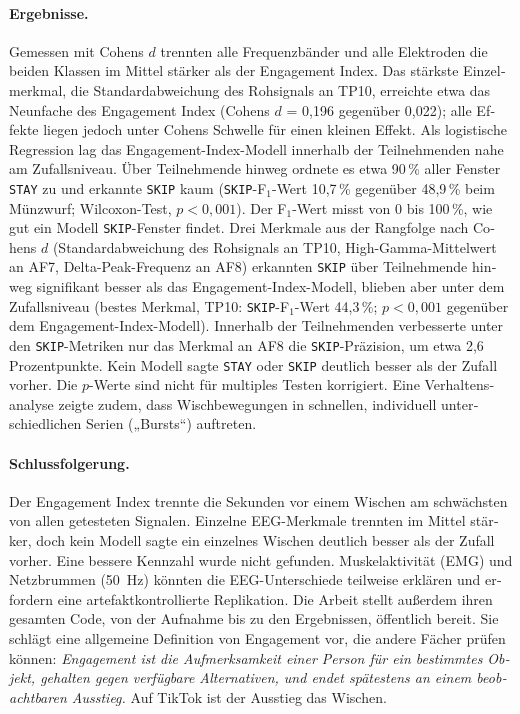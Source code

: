 \documentclass[12pt,a4paper]{report}
\begin{document}
\begin{otherlanguage}{ngerman}
\paragraph{Ergebnisse.} Gemessen mit Cohens \(d\) trennten alle Frequenzbänder und alle Elektroden die beiden Klassen im Mittel stärker als der Engagement Index. Das stärkste Einzelmerkmal, die Standardabweichung des Rohsignals an TP10, erreichte etwa das Neunfache des Engagement Index (Cohens \(d\) = 0{,}196 gegenüber 0{,}022); alle Effekte liegen jedoch unter Cohens Schwelle für einen kleinen Effekt. Als logistische Regression lag das Engagement-Index-Modell innerhalb der Teilnehmenden nahe am Zufallsniveau. Über Teilnehmende hinweg ordnete es etwa 90\,\% aller Fenster \texttt{STAY} zu und erkannte \texttt{SKIP} kaum (\texttt{SKIP}-F\(_1\)-Wert 10{,}7\,\% gegenüber 48{,}9\,\% beim Münzwurf; Wilcoxon-Test, \(p<0{,}001\)). Der F\(_1\)-Wert misst von 0 bis 100\,\%, wie gut ein Modell \texttt{SKIP}-Fenster findet. Drei Merkmale aus der Rangfolge nach Cohens \(d\) (Standardabweichung des Rohsignals an TP10, High-Gamma-Mittelwert an AF7, Delta-Peak-Frequenz an AF8) erkannten \texttt{SKIP} über Teilnehmende hinweg signifikant besser als das Engagement-Index-Modell, blieben aber unter dem Zufallsniveau (bestes Merkmal, TP10: \texttt{SKIP}-F\(_1\)-Wert 44{,}3\,\%; \(p<0{,}001\) gegenüber dem Engagement-Index-Modell). Innerhalb der Teilnehmenden verbesserte unter den \texttt{SKIP}-Metriken nur das Merkmal an AF8 die \texttt{SKIP}-Präzision, um etwa 2,6 Prozentpunkte. Kein Modell sagte \texttt{STAY} oder \texttt{SKIP} deutlich besser als der Zufall vorher. Die \(p\)-Werte sind nicht für multiples Testen korrigiert. Eine Verhaltensanalyse zeigte zudem, dass Wischbewegungen in schnellen, individuell unterschiedlichen Serien („Bursts“) auftreten.

\paragraph{Schlussfolgerung.} Der Engagement Index trennte die Sekunden vor einem Wischen am schwächsten von allen getesteten Signalen. Einzelne EEG-Merkmale trennten im Mittel stärker, doch kein Modell sagte ein einzelnes Wischen deutlich besser als der Zufall vorher. Eine bessere Kennzahl wurde nicht gefunden. Muskelaktivität (EMG) und Netzbrummen (50~Hz) könnten die EEG-Unterschiede teilweise erklären und erfordern eine artefaktkontrollierte Replikation. Die Arbeit stellt außerdem ihren gesamten Code, von der Aufnahme bis zu den Ergebnissen, öffentlich bereit. Sie schlägt eine allgemeine Definition von Engagement vor, die andere Fächer prüfen können: \emph{Engagement ist die Aufmerksamkeit einer Person für ein bestimmtes Objekt, gehalten gegen verfügbare Alternativen, und endet spätestens an einem beobachtbaren Ausstieg.} Auf TikTok ist der Ausstieg das Wischen.
\end{otherlanguage}
\end{document}
